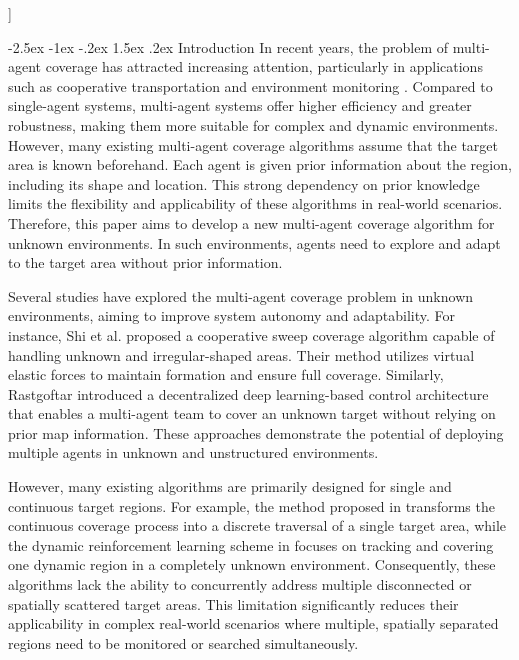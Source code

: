 \documentclass[fleqn,10pt,twocolumn]{main}
\makeatletter
\renewcommand\section{\@startsection{section}{1}{\z@}
  {-2.5ex \@plus -1ex \@minus -.2ex}
  {1.5ex \@plus .2ex}
  {\centering\normalfont\Large\bfseries}}
\makeatother
\begin{document}
  \vspace{1.4em} %
]

\pagestyle{headings}    %



\section{Introduction}
In recent years, the problem of multi-agent coverage has attracted increasing attention, particularly in applications such as cooperative transportation and environment monitoring \cite{Bai2022,Shibata2021,Chen2024,Bulla2021,Sacco2021,Dobrokvashina2021,Bai_23,Guo2021,Liu2025,Bai2018,Bai2025,magid2022asia}. Compared to single-agent systems, multi-agent systems offer higher efficiency and greater robustness, making them more suitable for complex and dynamic environments. However, many existing multi-agent coverage algorithms assume that the target area is known beforehand. Each agent is given prior information about the region, including its shape and location. This strong dependency on prior knowledge limits the flexibility and applicability of these algorithms in real-world scenarios. Therefore, this paper aims to develop a new multi-agent coverage algorithm for unknown environments. In such environments, agents need to explore and adapt to the target area without prior information.

Several studies have explored the multi-agent coverage problem in unknown environments, aiming to improve system autonomy and adaptability. For instance, Shi et al. \cite{Shi2018} proposed a cooperative sweep coverage algorithm capable of handling unknown and irregular-shaped areas. Their method utilizes virtual elastic forces to maintain formation and ensure full coverage. Similarly, Rastgoftar \cite{Rastgoftar2025} introduced a decentralized deep learning-based control architecture that enables a multi-agent team to cover an unknown target without relying on prior map information. These approaches demonstrate the potential of deploying multiple agents in unknown and unstructured environments.

However, many existing algorithms are primarily designed for single and continuous target regions. For example, the method proposed in \cite{Xiao2020} transforms the continuous coverage process into a discrete traversal of a single target area, while the dynamic reinforcement learning scheme in \cite{Cao2024} focuses on tracking and covering one dynamic region in a completely unknown environment. Consequently, these algorithms lack the ability to concurrently address multiple disconnected or spatially scattered target areas. This limitation significantly reduces their applicability in complex real-world scenarios where multiple, spatially separated regions need to be monitored or searched simultaneously.
\end{document}
